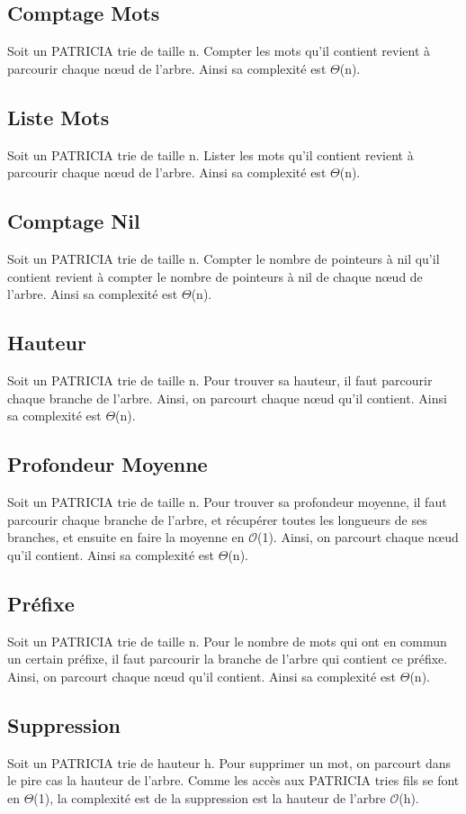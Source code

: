 \documentclass[a4paper,12pt]{report}
\begin{document}
\subsection{Comptage Mots}
Soit un PATRICIA trie de taille n. Compter les mots qu'il contient revient à parcourir chaque nœud de l'arbre. Ainsi sa complexité est $\Theta$(n).

\subsection{Liste Mots}
Soit un PATRICIA trie de taille n. Lister les mots qu'il contient revient à parcourir chaque nœud de l'arbre. Ainsi sa complexité est $\Theta$(n).

\subsection{Comptage Nil}
Soit un PATRICIA trie de taille n. Compter le nombre de pointeurs à nil qu'il contient revient à compter le nombre de pointeurs à nil de chaque nœud de l'arbre. Ainsi sa complexité est $\Theta$(n).

\subsection{Hauteur}
Soit un PATRICIA trie de taille n. Pour trouver sa hauteur, il faut parcourir chaque branche de l'arbre. Ainsi, on parcourt chaque nœud qu'il contient. Ainsi sa complexité est $\Theta$(n).

\subsection{Profondeur Moyenne}
Soit un PATRICIA trie de taille n. Pour trouver sa profondeur moyenne, il faut parcourir chaque branche de l'arbre, et récupérer toutes les longueurs de ses branches, et ensuite en faire la moyenne en $\mathcal{O}$(1). Ainsi, on parcourt chaque nœud qu'il contient. Ainsi sa complexité est $\Theta$(n).

\subsection{Préfixe}
Soit un PATRICIA trie de taille n. Pour le nombre de mots qui ont en commun un certain préfixe, il faut parcourir la branche de l'arbre qui contient ce préfixe. Ainsi, on parcourt chaque nœud qu'il contient. Ainsi sa complexité est $\Theta$(n).

\subsection{Suppression}
Soit un PATRICIA trie de hauteur h. Pour supprimer un mot, on parcourt dans le pire cas la hauteur de l'arbre. Comme les accès aux PATRICIA tries fils se font en $\Theta$(1), la complexité est de la suppression est la hauteur de l'arbre $\mathcal{O}$(h).
\end{document}
